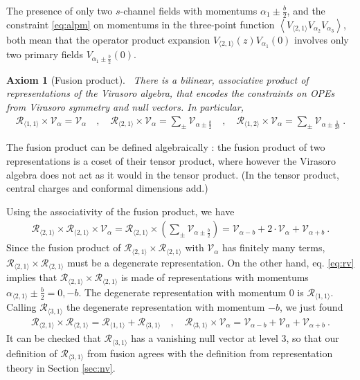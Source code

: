 \documentclass[12pt, a4paper]{article}
\theoremstyle{break}
\newtheorem{hyp}[exo]{Axiom}
\begin{document}
The presence of only two $s$-channel fields with momentums $\alpha_1\pm \frac{b}{2}$, and the constraint \eqref{eq:alpm} on momentums in the three-point function $\left<V_{\langle 2,1\rangle}V_{\alpha_2}V_{\alpha_3}\right>$, both mean that the operator product expansion $V_{\langle 2, 1 \rangle}(z) V_{\alpha_1}(0)$ involves only two primary fields $V_{\alpha_1\pm \frac{b}{2}}(0)$. 

\begin{hyp}[Fusion product]
 ~\label{hyp:fus}
 There is a bilinear, associative product of representations of the Virasoro algebra, that encodes the constraints on OPEs from Virasoro symmetry and null vectors. In particular,
 \begin{align}
  \mathcal{R}_{\langle 1,1\rangle}\times \mathcal V_\alpha = \mathcal V_\alpha \quad , \quad 
  \mathcal{R}_{\langle 2,1\rangle}\times \mathcal V_\alpha = \sum_\pm \mathcal V_{\alpha\pm \frac{b}{2}}\quad , \quad  
  \mathcal{R}_{\langle 1,2\rangle}\times \mathcal V_\alpha = \sum_\pm \mathcal V_{\alpha\pm \frac{1}{2b}}\ .
  \label{eq:rv}
 \end{align}
\end{hyp}
The fusion product can be defined algebraically \cite{gab99}: the fusion product of two representations is a coset of their tensor product, where however the Virasoro algebra does not act as it would in the tensor product. (In the tensor product, central charges and conformal dimensions add.) 

Using the associativity of the fusion product, we have 
\begin{align}
 \mathcal{R}_{\langle 2,1\rangle}\times \mathcal{R}_{\langle 2,1\rangle}  \times \mathcal V_\alpha  =
\mathcal{R}_{\langle 2,1\rangle}\times  \left(\sum_\pm \mathcal V_{\alpha\pm \frac{b}{2}}\right) =
\mathcal V_{\alpha - b} + 2\cdot \mathcal V_\alpha + \mathcal V_{\alpha + b} \ .
\end{align}
Since the fusion product of $\mathcal{R}_{\langle 2,1\rangle}\times \mathcal{R}_{\langle 2,1\rangle} $ with $\mathcal V_\alpha$ has finitely many terms, $\mathcal{R}_{\langle 2,1\rangle}\times \mathcal{R}_{\langle 2,1\rangle} $
must be a degenerate representation. 
On the other hand, eq. \eqref{eq:rv} implies that $\mathcal{R}_{\langle 2,1\rangle}\times \mathcal{R}_{\langle 2,1\rangle} $ is made of representations with momentums $\alpha_{\langle 2,1\rangle} \pm \frac{b}{2} = 0,-b$. The degenerate representation with momentum $0$ is $\mathcal{R}_{\langle 1,1\rangle}$. Calling $\mathcal{R}_{\langle 3,1\rangle}$ the degenerate representation with momentum $-b$, we just found
\begin{align}
 \mathcal{R}_{\langle 2,1\rangle}\times \mathcal{R}_{\langle 2,1\rangle} = \mathcal{R}_{\langle 1,1\rangle} + \mathcal{R}_{\langle 3,1\rangle} \quad , \quad \mathcal{R}_{\langle 3,1\rangle} \times \mathcal V_\alpha = \mathcal V_{\alpha - b} + \mathcal V_\alpha + \mathcal V_{\alpha + b}\ .
\end{align}
It can be checked that $\mathcal{R}_{\langle 3,1\rangle}$ has a vanishing null vector at level $3$, so that our definition of $\mathcal{R}_{\langle 3,1\rangle}$ from fusion agrees with the definition from representation theory in Section \ref{sec:nv}.
\end{document}
